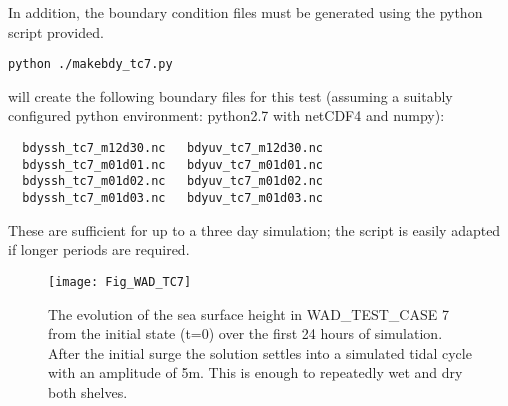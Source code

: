 In addition, the boundary condition files must be generated using the python script
provided.

\begin{verbatim}
python ./makebdy_tc7.py
\end{verbatim}

will create the following boundary files for this test (assuming a suitably configured
python environment: python2.7 with netCDF4 and numpy):

\begin{verbatim}
  bdyssh_tc7_m12d30.nc   bdyuv_tc7_m12d30.nc
  bdyssh_tc7_m01d01.nc   bdyuv_tc7_m01d01.nc
  bdyssh_tc7_m01d02.nc   bdyuv_tc7_m01d02.nc
  bdyssh_tc7_m01d03.nc   bdyuv_tc7_m01d03.nc
\end{verbatim}

These are sufficient for up to a three day simulation; the script is easily adapted if
longer periods are required.

\begin{sidewaysfigure}[htb] \begin{center}
\texttt{[image: Fig\_WAD\_TC7]}
\caption{ \label{Fig_WAD_TC7}
The evolution of the sea surface height in WAD\_TEST\_CASE 7 from the initial state (t=0)
over the first 24 hours of simulation. After the initial surge the solution settles into a
simulated tidal cycle with an amplitude of 5m. This is enough to repeatedly wet and dry
both shelves.}

\end{center}\end{sidewaysfigure}







